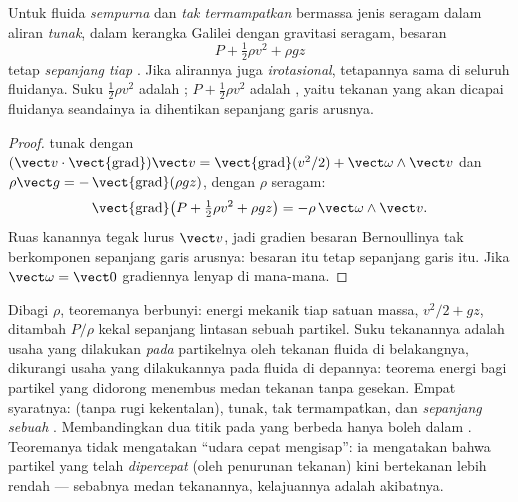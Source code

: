 \begin{theorem}[Bernoulli]\label{thm:b2:euler-bernoulli:bernoulli}
Untuk fluida \emph{sempurna} dan \emph{tak termampatkan} bermassa jenis
seragam dalam aliran \emph{tunak}, dalam kerangka Galilei dengan gravitasi seragam, besaran
\[
P + \tfrac12\rho v^2 + \rho gz
\]
tetap \emph{sepanjang tiap }. Jika alirannya juga
\emph{irotasional}, tetapannya sama di seluruh fluidanya. Suku
$\tfrac12\rho v^2$ adalah \emph{}; $P + \tfrac12\rho v^2$
adalah \emph{}, yaitu tekanan yang akan dicapai fluidanya
seandainya ia dihentikan sepanjang garis arusnya.
\end{theorem}

\begin{proof}
 tunak dengan $(\vect v\cdot\operatorname{\vect{grad}})\vect v =
\operatorname{\vect{grad}}(v^2/2) + \vect\omega\wedge\vect v$ dan $\rho\vect g =
-\operatorname{\vect{grad}}(\rho gz)$, dengan $\rho$ seragam:
\[
\operatorname{\vect{grad}}\bigl(P + \tfrac12\rho v^2 + \rho gz\bigr) = -\rho\,
\vect\omega\wedge\vect v .
\]
Ruas kanannya tegak lurus $\vect v$, jadi gradien besaran Bernoullinya
tak berkomponen sepanjang garis arusnya: besaran itu tetap sepanjang
garis itu. Jika $\vect\omega = \vect 0$ gradiennya lenyap di mana-mana.
\end{proof}

\begin{remark}\label{rem:b2:euler-bernoulli:meaning}
Dibagi $\rho$, teoremanya berbunyi: energi mekanik tiap satuan massa,
$v^2/2 + gz$, ditambah $P/\rho$ kekal sepanjang lintasan sebuah partikel.
Suku tekanannya adalah usaha yang dilakukan \emph{pada} partikelnya oleh
tekanan fluida di belakangnya, dikurangi usaha yang dilakukannya pada
fluida di depannya: teorema energi bagi partikel yang didorong menembus
medan tekanan tanpa gesekan. Empat syaratnya:  (tanpa
rugi kekentalan), tunak, tak termampatkan, dan \emph{sepanjang sebuah
}. Membandingkan dua titik pada  yang berbeda hanya
boleh dalam . Teoremanya tidak mengatakan
``udara cepat mengisap'': ia mengatakan bahwa partikel yang telah
\emph{dipercepat} (oleh penurunan tekanan) kini bertekanan lebih rendah
--- sebabnya medan tekanannya, kelajuannya adalah akibatnya.
\end{remark}


